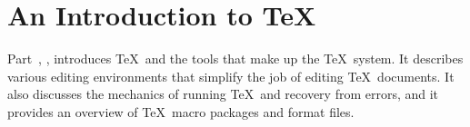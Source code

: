 \cleardoublepage
{}

\part{An Introduction to \protect\TeX}
\label{part:intro}

Part~\ref{part:intro}, {\it{}}, introduces \TeX\ and the
tools that make up the \TeX\ system.  It describes various editing
environments that simplify the job of editing \TeX\ documents.  It also
discusses the mechanics of running \TeX\ and recovery from errors, and it
provides an overview of \TeX\ macro packages and format files.

